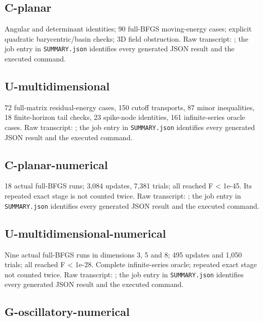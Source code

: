 \subsection{C-planar}\label{c-planar}

Angular and determinant identities; 90 full-BFGS moving-energy cases; explicit quadratic barycentric/basin checks; 3D field obstruction. Raw transcript: ; the job entry in \texttt{SUMMARY.json} identifies every generated JSON result and the executed command.

\subsection{U-multidimensional}\label{u-multidimensional}

72 full-matrix residual-energy cases, 150 cutoff transports, 87 minor inequalities, 18 finite-horizon tail checks, 23 spike-node identities, 161 infinite-series oracle cases. Raw transcript: ; the job entry in \texttt{SUMMARY.json} identifies every generated JSON result and the executed command.

\subsection{C-planar-numerical}\label{c-planar-numerical}

18 actual full-BFGS runs; 3,084 updates, 7,381 trials; all reached F \textless{} 1e-45. Its repeated exact stage is not counted twice. Raw transcript: ; the job entry in \texttt{SUMMARY.json} identifies every generated JSON result and the executed command.

\subsection{U-multidimensional-numerical}\label{u-multidimensional-numerical}

Nine actual full-BFGS runs in dimensions 3, 5 and 8; 495 updates and 1,050 trials; all reached F \textless{} 1e-28. Complete infinite-series oracle; repeated exact stage not counted twice. Raw transcript: ; the job entry in \texttt{SUMMARY.json} identifies every generated JSON result and the executed command.

\subsection{G-oscillatory-numerical}\label{g-oscillatory-numerical}

